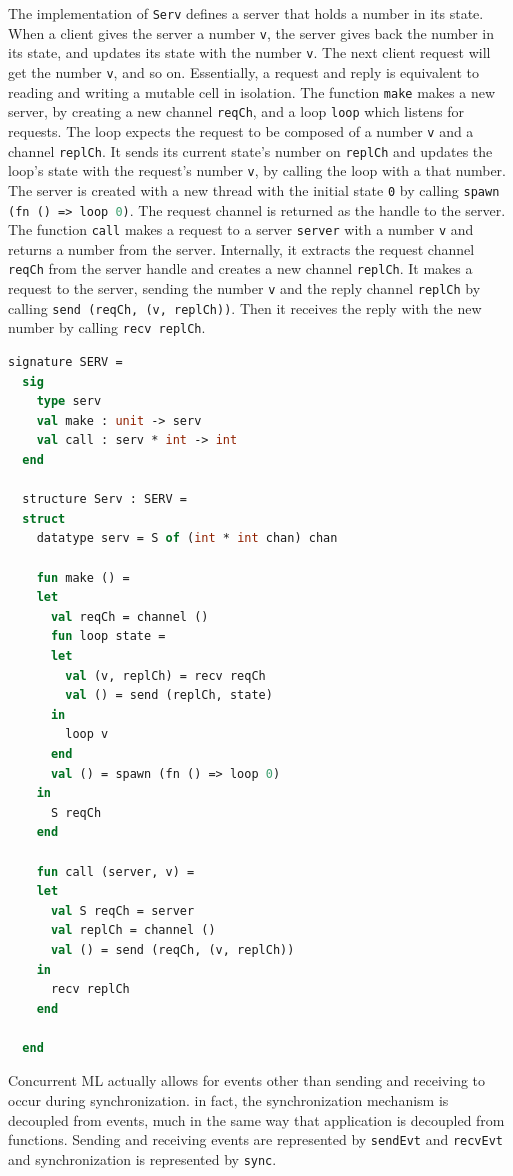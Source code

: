 \documentclass[letterpaper, 11pt]{report}
\begin{document}
The implementation of \lstinline{Serv} defines a server that holds a number in its state.
When a client gives the server a number \lstinline{v}, the server gives back the number in
its state, and updates its state with the number \lstinline{v}. The next client request will
get the number \lstinline{v}, and so on. Essentially, a request and reply is equivalent
to reading and writing a mutable cell in isolation. The function \lstinline{make} makes a new
server, by creating a new channel \lstinline{reqCh}, and a loop \lstinline{loop} which listens
for requests. The loop expects the request to be composed of a number \lstinline{v} and a
channel \lstinline{replCh}. It sends its current state's number on \lstinline{replCh} and
updates the loop's state with the request's number \lstinline{v}, by calling the loop with a
that number. The server is created with a new thread with the initial state \lstinline{0}
by calling \lstinline[language=ML]{spawn (fn () => loop 0)}. The request channel is returned
as the handle to the server. The function \lstinline{call} makes a request to a server
\lstinline{server} with a number \lstinline{v} and returns a number from the
server. Internally, it extracts the request channel \lstinline{reqCh} from the
server handle and creates a new channel \lstinline{replCh}. It makes a request to the server,
sending the number \lstinline{v} and the reply channel \lstinline{replCh} by calling
\lstinline{send (reqCh, (v, replCh))}. Then it receives the reply with the new number by
calling \lstinline{recv replCh}.


\begin{lstlisting}[language=ML, mathescape]
  signature SERV =
  sig 
    type serv
    val make : unit -> serv
    val call : serv * int -> int
  end

  structure Serv : SERV =
  struct 
    datatype serv = S of (int * int chan) chan

    fun make () =
    let 
      val reqCh = channel ()
      fun loop state =
      let
        val (v, replCh) = recv reqCh
        val () = send (replCh, state)
      in
        loop v
      end
      val () = spawn (fn () => loop 0)
    in
      S reqCh
    end 

    fun call (server, v) =
    let 
      val S reqCh = server
      val replCh = channel () 
      val () = send (reqCh, (v, replCh))
    in
      recv replCh
    end

  end
\end{lstlisting}


Concurrent ML actually allows for events other than sending and receiving to
occur during synchronization. in fact, the synchronization mechanism is decoupled from
events, much in the same way that application is decoupled
from functions. Sending and receiving events are represented by \lstinline{sendEvt}
and \lstinline{recvEvt} and synchronization is represented by \lstinline{sync}.
\end{document}
